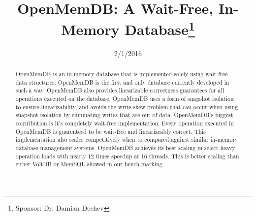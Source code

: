 \documentclass[conference, compsoc]{IEEEtran}
\begin{document}
\title{OpenMemDB: A Wait-Free, In-Memory Database\thanks{Sponsor: Dr. Damian Dechev}}
\author{
 \and 
{} \and 
{} \and 
{}
}

\date{2/1/2016}

\maketitle
\newpage

\begin{abstract}
OpenMemDB is an in-memory database that is implemented solely using wait-free
data structures. OpenMemDB is the first and only database currently developed in such a
way. OpenMemDB also provides linearizable correctness guarantees for all operations
executed on the database. OpenMemDB uses a form of snapshot isolation to ensure 
linearizability, and avoids the write-skew problem that can occur when using
snapshot isolation by eliminating writes that are out of data. 
OpenMemDB's biggest contribution is it's completely wait-free 
implementation. Every operation executed in OpenMemDB is guarenteed to be wait-free 
and linearizeably correct. This implementation also scales competitively when to compared 
against similar in-memory database management systems.
OpenMemDB achieves its best scaling in select heavy operation loads with nearly 
12 times speedup at 16 threads. This is better scaling than either VoltDB or MemSQL showed
in our bench-marking. 
\end{abstract}
\end{document}
